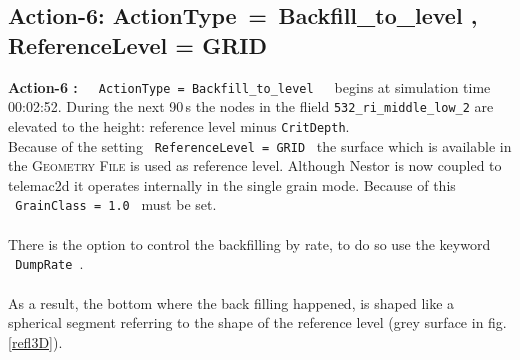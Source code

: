 \subsection{Action-6: ActionType\, = \,Backfill\_to\_level , ReferenceLevel = GRID}
\label{ssec:E4Action6}
\textbf{Action-6 :}~~~\texttt{ActionType\,=\,Backfill\_to\_level}~~~begins at simulation time 00:02:52.
During the next 90\,s the nodes in the flield \texttt{532\_ri\_middle\_low\_2} are elevated to the
height: reference level minus \texttt{CritDepth}.\\
Because of the setting \texttt{~ReferenceLevel\,=\,GRID~} the surface which is available
in the \textsc{Geometry File} is used as reference level.
Although Nestor is now coupled to telemac2d it operates internally in the single grain mode. Because of this
\texttt{~GrainClass\,=\,1.0~} must be set.\\
\\
There is the option to control the backfilling by rate, to do so use the keyword \texttt{~DumpRate~}.\\
\\
As a result, the bottom where the back filling happened, is shaped like a spherical segment referring to the shape of
the reference level (grey surface in fig.\,\ref{refl3D}).\\
\\
